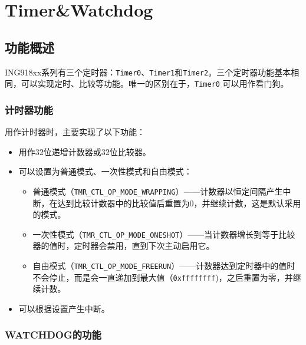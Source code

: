 \documentclass[
  12pt,
]{book}
\begin{document}
\hypertarget{timerwatchdog}{%
\chapter{Timer\&Watchdog}\label{timerwatchdog}}

\hypertarget{ux529fux80fdux6982ux8ff0-4}{%
\section{功能概述}\label{ux529fux80fdux6982ux8ff0-4}}

ING918xx系列有三个定时器：\texttt{Timer0}、\texttt{Timer1}和\texttt{Timer2}。三个定时器功能基本相同，可以实现定时、比较等功能。唯一的区别在于，\texttt{Timer0} 可以用作看门狗。

\hypertarget{ux8ba1ux65f6ux5668ux529fux80fd}{%
\subsection{计时器功能}\label{ux8ba1ux65f6ux5668ux529fux80fd}}

用作计时器时，主要实现了以下功能：

\begin{itemize}
\item
  用作32位递增计数器或32位比较器。
\item
  可以设置为普通模式、一次性模式和自由模式：

  \begin{itemize}
  \item
    普通模式（\texttt{TMR\_CTL\_OP\_MODE\_WRAPPING}）------计数器以恒定间隔产生中断，在达到比较计数器中的比较值后重置为0，并继续计数，这是默认采用的模式。
  \item
    一次性模式（\texttt{TMR\_CTL\_OP\_MODE\_ONESHOT}）------当计数器增长到等于比较器的值时，定时器会禁用，直到下次主动启用它。
  \item
    自由模式（\texttt{TMR\_CTL\_OP\_MODE\_FREERUN}）------计数器达到定时器中的值时不会停止，而是会一直递加到最大值（\texttt{0xffffffff})，之后重置为零，并继续计数。
  \end{itemize}
\item
  可以根据设置产生中断。
\end{itemize}

\hypertarget{watchdogux7684ux529fux80fd}{%
\subsection{WATCHDOG的功能}\label{watchdogux7684ux529fux80fd}}
\end{document}
